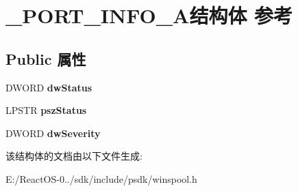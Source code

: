 \hypertarget{struct___p_o_r_t___i_n_f_o__3_a}{}\section{\+\_\+\+P\+O\+R\+T\+\_\+\+I\+N\+F\+O\+\_\+A结构体 参考}
\label{struct___p_o_r_t___i_n_f_o__3_a}
\subsection*{Public 属性}
\begin{DoxyCompactItemize}
\item 
\mbox{\label{struct___p_o_r_t___i_n_f_o__3_a_a95c5331a4755a23a22c50a3834a7635c}} 
D\+W\+O\+RD {\bfseries dw\+Status}
\item 
\mbox{\label{struct___p_o_r_t___i_n_f_o__3_a_ac63d0fe479366b4ff713f22990dd8d9d}} 
L\+P\+S\+TR {\bfseries psz\+Status}
\item 
\mbox{\label{struct___p_o_r_t___i_n_f_o__3_a_a1ce1eb53dbd0b4a3f1c7dfb05092432f}} 
D\+W\+O\+RD {\bfseries dw\+Severity}
\end{DoxyCompactItemize}


该结构体的文档由以下文件生成\+:\begin{DoxyCompactItemize}
\item 
E\+:/\+React\+O\+S-\/0../sdk/include/psdk/winspool.\+h\end{DoxyCompactItemize}
